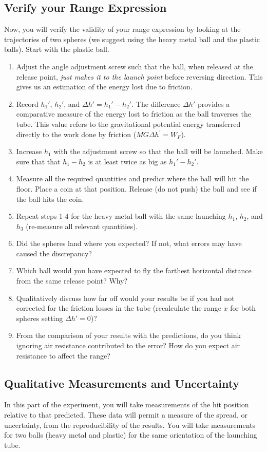 \subsection{Verify your Range Expression}
Now, you will verify the validity of your range expression by looking at the trajectories of two spheres (we suggest using the heavy metal ball and the plastic balls). Start with the plastic ball.
\begin{enumerate}
\item Adjust the angle adjustment screw such that the ball, when released at the release point, {\it{just makes it to the launch point}} before reversing direction. This gives us an estimation of the energy lost due to friction.
\item Record $h_1'$, $h_2'$, and $\Delta h' = h_1' - h_2'$. The difference $\Delta h'$ provides a comparative measure of the energy lost to friction as the ball traverses the tube. This value refers to the gravitational potential energy transferred directly to the work done by friction ($ MG\Delta h^{\prime}=W_{F}$).
\item Increase $h_1$ with the adjustment screw so that the ball will be launched. Make sure that that $h_1-h_2$ is at least twice as big as $h_1'-h_2'$.
\item Measure all the required quantities and predict where the ball will hit the floor. Place a coin at that position. Release (do not push) the ball and see if the ball hits the coin.
\item Repeat steps 1-4 for the heavy metal ball with the same launching $h_1$, $h_2$, and $h_3$ (re-measure all relevant quantities).
\item Did the spheres land where you expected? If not, what errors may have caused the discrepancy?
\item Which ball would you have expected to fly the farthest horizontal distance from the same release point? Why?
\item Qualitatively discuss how far off would your results be if you had not corrected for the friction losses in the tube (recalculate the range $x$ for both spheres setting $\Delta h'=0$)?
\item From the comparison of your results with the predictions, do you think ignoring air resistance contributed to the error? How do you expect air resistance to affect the range?
\end{enumerate}

\subsection{Qualitative Measurements and Uncertainty}
In this part of the experiment, you will take measurements of the hit position relative to that predicted. These data will permit a measure of the spread, or uncertainty, from the reproducibility of the results. You will take measurements for two balls (heavy metal and plastic) for the same orientation of the launching tube.\myskip

